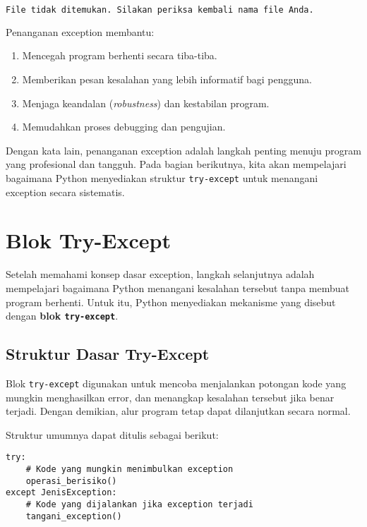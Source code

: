 \begin{lstlisting}[language=bash]
File tidak ditemukan. Silakan periksa kembali nama file Anda.
\end{lstlisting}

Penanganan exception membantu:
\begin{enumerate}
    \item Mencegah program berhenti secara tiba-tiba.
    \item Memberikan pesan kesalahan yang lebih informatif bagi pengguna.
    \item Menjaga keandalan (\textit{robustness}) dan kestabilan program.
    \item Memudahkan proses debugging dan pengujian.
\end{enumerate}

Dengan kata lain, penanganan exception adalah langkah penting menuju program yang profesional dan tangguh. Pada bagian berikutnya, kita akan mempelajari bagaimana Python menyediakan struktur \texttt{try-except} untuk menangani exception secara sistematis.


\section{Blok Try-Except}

Setelah memahami konsep dasar exception, langkah selanjutnya adalah mempelajari bagaimana Python menangani kesalahan tersebut tanpa membuat program berhenti. Untuk itu, Python menyediakan mekanisme yang disebut dengan \textbf{blok \texttt{try-except}}.

\subsection*{Struktur Dasar Try-Except}

Blok \texttt{try-except} digunakan untuk mencoba menjalankan potongan kode yang mungkin menghasilkan error, dan menangkap kesalahan tersebut jika benar terjadi. Dengan demikian, alur program tetap dapat dilanjutkan secara normal.

Struktur umumnya dapat ditulis sebagai berikut:

\begin{lstlisting}[style=PythonStyle, caption={Struktur dasar try-except di Python}]
try:
    # Kode yang mungkin menimbulkan exception
    operasi_berisiko()
except JenisException:
    # Kode yang dijalankan jika exception terjadi
    tangani_exception()
\end{lstlisting}

